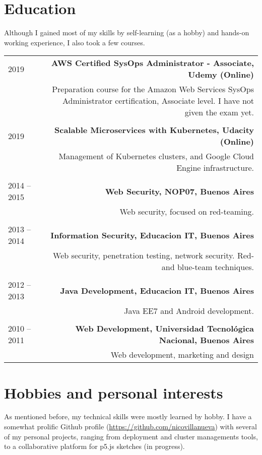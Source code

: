 \documentclass{vitae}
\begin{document}
\newpage

\section*{Education}
Although I gained most of my skills by self-learning (as a hobby) and hands-on working experience, I also took a few courses.

\begin{tabular}{L!{\VRule}R}
2019&{\bf AWS Certified SysOps Administrator - Associate, Udemy (Online)}\\
&Preparation course for the Amazon Web Services SysOps Administrator certification, Associate level. I have not given the exam yet.\\
\\
2019&{\bf Scalable Microservices with Kubernetes, Udacity (Online)}\\
&Management of Kubernetes clusters, and Google Cloud Engine infrastructure.\\
\\
2014 -- 2015&{\bf Web Security, NOP07, Buenos Aires}\\
&Web security, focused on red-teaming.\\
\\
2013 -- 2014&{\bf Information Security, Educacion IT, Buenos Aires}\\
&Web security, penetration testing, network security. Red- and blue-team techniques.\\
\\
2012 -- 2013&{\bf Java Development, Educacion IT, Buenos Aires}\\
&Java EE7 and Android development.\\
\\
2010 -- 2011&{\bf Web Development, Universidad Tecnológica Nacional, Buenos Aires}\\
&Web development, marketing and design\\

\end{tabular}

\section*{Hobbies and personal interests}
As mentioned before, my technical skills were mostly learned by hobby. I have a somewhat prolific Github profile (\url{https://github.com/nicovillanueva}) with several of my personal projects, ranging from deployment and cluster managements tools, to a collaborative platform for p5.js sketches (in progress).
\end{document}
